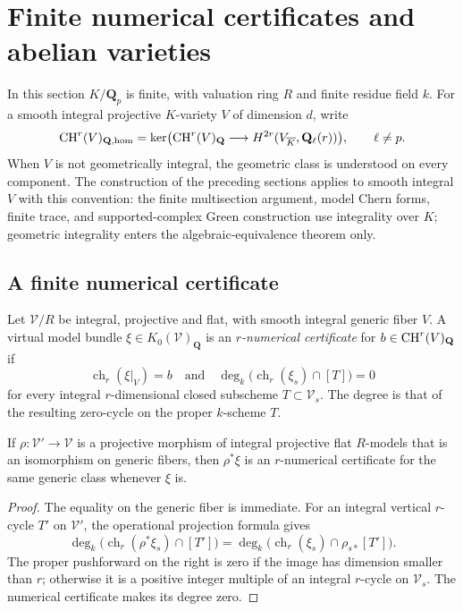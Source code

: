\section{Finite numerical certificates and abelian varieties}
\label{sec:abelian-numerical}

In this section $K/\mathbf Q_p$ is finite, with valuation ring $R$
and finite residue field $k$.  For a smooth integral projective
$K$-variety $V$ of dimension $d$, write
\[
 \operatorname{CH}^r(V)_{\mathbf Q,\mathrm{hom}}
 =\ker\bigl(\operatorname{CH}^r(V)_{\mathbf Q}\longrightarrow
          H^{2r}(V_{\overline K},\mathbf Q_\ell(r))\bigr),
 \qquad \ell\ne p.
\]
When $V$ is not geometrically integral, the geometric class is
understood on every component.  The construction of the preceding
sections applies to smooth integral $V$ with this convention: the
finite multisection argument, model Chern forms, finite trace, and
supported-complex Green construction use integrality over $K$;
geometric integrality enters the algebraic-equivalence theorem only.

\subsection{A finite numerical certificate}

\begin{definition}\label{def:numerical-certificate}
Let $\mathcal V/R$ be integral, projective and flat, with smooth
integral generic fiber $V$.  A virtual model bundle
$\xi\in K_0(\mathcal V)_{\mathbf Q}$ is an
\emph{$r$-numerical certificate} for
$b\in\operatorname{CH}^r(V)_{\mathbf Q}$ if
\[
  \operatorname{ch}_r(\xi|_V)=b
\quad\text{and}\quad
  \deg_k\bigl(\operatorname{ch}_r(\xi_s)\cap[T]\bigr)=0
\]
for every integral $r$-dimensional closed subscheme
$T\subset\mathcal V_s$.  The degree is that of the resulting
zero-cycle on the proper $k$-scheme $T$.
\end{definition}

\begin{lemma}
\label{lem:refine-certificate}
If $\rho:\mathcal V'\to\mathcal V$ is a projective morphism of
integral projective flat $R$-models that is an isomorphism on
generic fibers, then $\rho^*\xi$ is an $r$-numerical certificate
for the same generic class whenever $\xi$ is.
\end{lemma}

\begin{proof}
The equality on the generic fiber is immediate.  For an integral
vertical $r$-cycle $T'$ on $\mathcal V'$, the operational projection
formula gives
\[
 \deg_k\bigl(\operatorname{ch}_r(\rho^*\xi_s)\cap[T']\bigr)
 =\deg_k\bigl(\operatorname{ch}_r(\xi_s)\cap\rho_{s*}[T']\bigr).
\]
The proper pushforward on the right is zero if the image has
dimension smaller than $r$; otherwise it is a positive integer
multiple of an integral $r$-cycle on $\mathcal V_s$.  The numerical
certificate makes its degree zero.
\end{proof}


